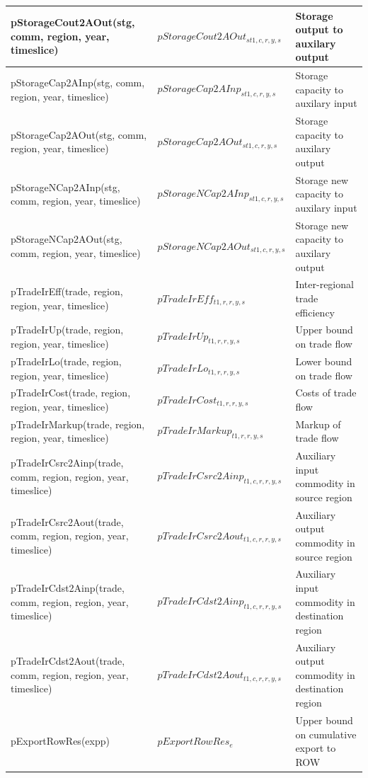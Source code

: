\documentclass{article}
\begin{document}
\begin{longtable}{|p{10cm}|p{5cm}|p{9cm}|}
 \hline
pStorageCout2AOut(stg, comm, region, year, timeslice) & $pStorageCout2AOut_{st1,c,r,y,s}$ & Storage output to auxilary output \\
 \hline
pStorageCap2AInp(stg, comm, region, year, timeslice) & $pStorageCap2AInp_{st1,c,r,y,s}$ & Storage capacity to auxilary input \\
 \hline
pStorageCap2AOut(stg, comm, region, year, timeslice) & $pStorageCap2AOut_{st1,c,r,y,s}$ & Storage capacity to auxilary output \\
 \hline
pStorageNCap2AInp(stg, comm, region, year, timeslice) & $pStorageNCap2AInp_{st1,c,r,y,s}$ & Storage new capacity to auxilary input \\
 \hline
pStorageNCap2AOut(stg, comm, region, year, timeslice) & $pStorageNCap2AOut_{st1,c,r,y,s}$ & Storage new capacity to auxilary output \\
 \hline
pTradeIrEff(trade, region, region, year, timeslice) & $pTradeIrEff_{t1,r,r,y,s}$ & Inter-regional trade efficiency \\
 \hline
pTradeIrUp(trade, region, region, year, timeslice) & $pTradeIrUp_{t1,r,r,y,s}$ & Upper bound on trade flow \\
 \hline
pTradeIrLo(trade, region, region, year, timeslice) & $pTradeIrLo_{t1,r,r,y,s}$ & Lower bound on trade flow \\
 \hline
pTradeIrCost(trade, region, region, year, timeslice) & $pTradeIrCost_{t1,r,r,y,s}$ & Costs of trade flow \\
 \hline
pTradeIrMarkup(trade, region, region, year, timeslice) & $pTradeIrMarkup_{t1,r,r,y,s}$ & Markup of trade flow \\
 \hline
pTradeIrCsrc2Ainp(trade, comm, region, region, year, timeslice) & $pTradeIrCsrc2Ainp_{t1,c,r,r,y,s}$ & Auxiliary input commodity in source region \\
 \hline
pTradeIrCsrc2Aout(trade, comm, region, region, year, timeslice) & $pTradeIrCsrc2Aout_{t1,c,r,r,y,s}$ & Auxiliary output commodity in source region \\
 \hline
pTradeIrCdst2Ainp(trade, comm, region, region, year, timeslice) & $pTradeIrCdst2Ainp_{t1,c,r,r,y,s}$ & Auxiliary input commodity in destination region \\
 \hline
pTradeIrCdst2Aout(trade, comm, region, region, year, timeslice) & $pTradeIrCdst2Aout_{t1,c,r,r,y,s}$ & Auxiliary output commodity in destination region \\
 \hline
pExportRowRes(expp) & $pExportRowRes_{e}$ & Upper bound on cumulative export to ROW \\

\end{longtable}
\end{document}
